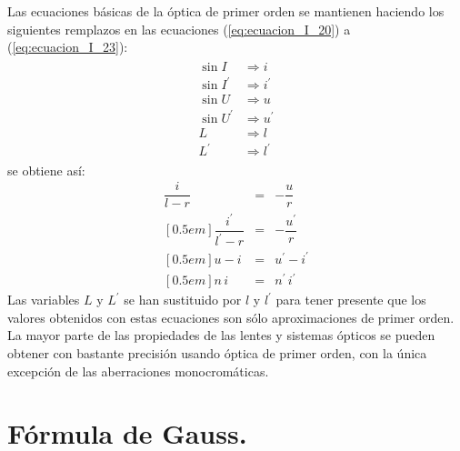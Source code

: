 \documentclass[14pt]{extarticle}
\begin{document}
Las ecuaciones básicas de la óptica de primer orden se mantienen haciendo los siguientes remplazos en las ecuaciones (\ref{eq:ecuacion_I_20}) a (\ref{eq:ecuacion_I_23}):
\begin{align}
\begin{aligned}
\sin I &\Rightarrow i \\
\sin I^{\prime} &\Rightarrow i^{\prime} \\
\sin U &\Rightarrow u \\
\sin U^{\prime} &\Rightarrow u^{\prime} \\
L &\Rightarrow l \\
L^{\prime} &\Rightarrow l^{\prime}
\end{aligned}
\label{eq:ecuacion_I_24}
\end{align}
se obtiene así:
\begin{eqnarray}
\dfrac{i}{l - r} &=& - \dfrac{u}{r} \label{eq:ecuacion_I_25} \\ [0.5em]
\dfrac{i^{\prime}}{l^{\prime} - r} &=& - \dfrac{u^{\prime}}{r} \label{eq:ecuacion_I_26} \\ [0.5em]
u - i &=& u^{\prime} - i^{\prime} \label{eq:ecuacion_I_27} \\ [0.5em]
n \, i &=& n^{\prime} \, i^{\prime} \label{eq:ecuacion_I_28}
\end{eqnarray}
Las variables $L$ y $L^{\prime}$ se han sustituido por $l$ y $l^{\prime}$ para tener presente que los valores obtenidos con estas ecuaciones son sólo aproximaciones de primer orden. La mayor parte de las propiedades de las lentes y sistemas ópticos se pueden obtener con bastante precisión usando óptica de primer orden, con la única excepción de las aberraciones monocromáticas.

\section{Fórmula de Gauss.}
\end{document}
